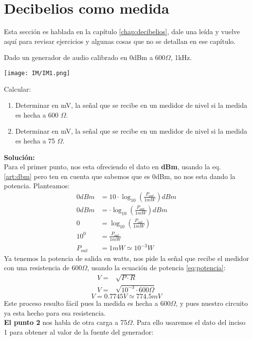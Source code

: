 \documentclass[
	12pt, %
	fleqn, %
	a4paper, %
	oneside, %
]{LegrandOrangeBook}
\begin{document}
\section{Decibelios como medida}
Esta sección es hablada en la capítulo \ref{chap:decibelios}, dale una leída y vuelve aquí para revisar ejercicios y algunas cosas que no se detallan en ese capítulo.
\begin{example}
\label{exa:01}
Dado un generador de audio calibrado en 0dBm a 600$\Omega$, 1kHz.
\begin{center}
\texttt{[image: IM/IM1.png]}
\end{center}
Calcular:\\
\begin{enumerate}
\item Determinar en mV, la señal que se recibe en un medidor de nivel si la
medida es hecha a 600 $\Omega$.
\item Determinar en mV, la señal que se recibe en un medidor de nivel si la
medida es hecha a 75 $\Omega$.
\end{enumerate}
\textbf{Solución:}\\
Para el primer punto, nos esta ofreciendo el dato en \textbf{dBm}, usando la eq. \ref{art:dbm} pero ten en cuenta que sabemos que es 0dBm, no nos esta dando la potencia. Planteamos:
\begin{align*}
0dBm&=10\cdot\log_{10}\left(\frac{P_{out}}{1mW}\right)dBm\\
0dBm&=\cdot\log_{10}\left(\frac{P_{out}}{1mW}\right)dBm\\
0&=\log_{10}\left(\frac{P_{out}}{1mW}\right)\\
10^0&=\frac{P_{out}}{1mW}\\
P_{out}&=1mW\simeq 10^{-3}W
\end{align*}
Ya tenemos la potencia de salida en watts, nos pide la señal que recibe el medidor con una resistencia de 600$\Omega$, usando la ecuación de potencia \ref{eq:potencia}:
\begin{align*}
V=&\sqrt{P\cdot R}\\
V=&\sqrt{10^{-3}\cdot 600\Omega}
\end{align*}
\begin{equation*}
\boxed{V=0.7745V\simeq 774.5mV}
\end{equation*}
Este proceso resulto fácil pues la medida es hecha a 600$\Omega$, y pues nuestro circuito ya esta hecho para esa resistencia.\\
\textbf{El punto 2} nos habla de otra carga a 75$\Omega$. Para ello usaremos el dato del inciso 1 para obtener al valor de la fuente del generador:

\end{example}
\end{document}
